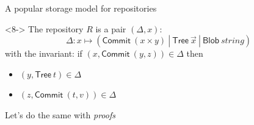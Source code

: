 \documentclass[ignorenonframetext,red]{beamer}
\newcommand\gor{\ |\ }
\begin{document}
\begin{frame}{A popular storage model for repositories}
\begin{onlyenv}
\begin{center}
    \end{center}
  \end{onlyenv}
  \begin{onlyenv}<8->
    The repository $R$ is a pair $(\Delta, x)$:
    \[ \Delta : x \mapsto (\mathsf{Commit}\ (x\times y) \gor \mathsf{Tree}\ \vec x
    \gor \mathsf{Blob}\ string)\]
    with the invariant:
    if $(x, \mathsf{Commit}\ (y,z)) \in\Delta$ then
    \begin{itemize}
    \item $(y, \mathsf{Tree}\ t)\in\Delta$
    \item $(z, \mathsf{Commit}\ (t,v))\in\Delta$
    \end{itemize}
    \pause
    \begin{center}
      \vspace{4em} {\Large Let's do the same with \emph{proofs}}
     \end{center}
  \end{onlyenv}
\end{frame}
\end{document}
